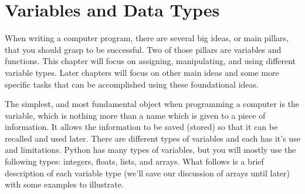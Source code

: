 \chapter{Variables and Data Types}
\label{chap:variablesDataTypes}



When writing a computer program, there are several big ideas, or main
pillars, that you should grasp to be successful.  Two of those pillars
are variables and functions. This chapter will focus on assigning,
manipulating, and using different variable types.  Later chapters will
focus on other main ideas and some more specific tasks that can be
accomplished using these foundational ideas.

The simplest, and most fundamental object when programming a computer
is the variable, which is nothing more than a name which is given to a
piece of information. It allows the information to be saved (stored)
so that it can be recalled and used later.   There
are different types of variables and each has it's use and
limitations.  Python has many types of variables, but you will mostly
use the following types: integers, floats, lists, and arrays.  What
follows is a brief description of each variable type (we'll save our
discussion of arrays until later) with some examples to illustrate.

